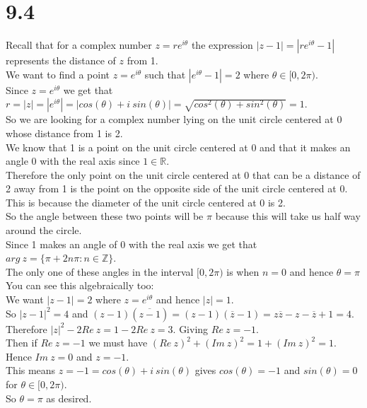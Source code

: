 \documentclass{article}
\begin{document}
\newpage
\section*{9.4}
\begin{center}
    \doublespacing
    Recall that for a complex number $z = r e^{i\theta}$ the expression $|z - 1| = |r e^{i\theta} - 1|$ represents the distance of $z$ from 1.
    \\We want to find a point $z = e^{i\theta}$ such that $|e^{i\theta} - 1| = 2$ where $\theta\in [0, 2\pi)$.
    \\Since $z = e^{i\theta}$ we get that $r = |z| = |e^{i\theta}| = |cos(\theta) + i\:sin(\theta)| =\sqrt{cos^2 (\theta) + sin^2 (\theta)} = 1$.
    \\So we are looking for a complex number lying on the unit circle centered at 0 whose distance from 1 is 2.
    \\We know that 1 is a point on the unit circle centered at 0 and that it makes an angle 0 with the real axis since $1\in\mathbb{R}$.
    \\Therefore the only point on the unit circle centered at 0 that can be a distance of 2 away from 1 is the point on the opposite side of the unit circle centered at 0. This is because the diameter of the unit circle centered at 0 is 2.
    \break
    \\So the angle between these two points will be $\pi$ because this will take us half way around the circle.
    \\Since 1 makes an angle of 0 with the real axis we get that $arg\:z =\{\pi + 2n\pi: n\in\mathbb{Z}\}$.
    \\The only one of these angles in the interval $[0, 2\pi)$ is when $n = 0$ and hence $\theta =\pi$ \qedsymbol
    \break
    \\You can see this algebraically too:
    \\We want $|z - 1| = 2$ where $z = e^{i\theta}$ and hence $|z| = 1$.
    \\So $|z - 1|^2 = 4$ and $(z-1)(\overline{z-1}) = (z-1)(\overline{z} - 1) = z\overline{z} - z -\overline{z} + 1 = 4$.
    \\Therefore $|z|^2 - 2 Re\:z = 1 - 2 Re\:z = 3$. Giving $Re\:z = -1$.
    \\Then if $Re\:z = -1$ we must have $(Re\:z)^2 + (Im\:z)^2 = 1 + (Im\:z)^2 = 1$. Hence $Im\:z = 0$ and $z = -1$.
    \\This means $z = -1 = cos(\theta) + i\:sin(\theta)$ gives $cos(\theta) = -1$ and $sin(\theta) = 0$ for $\theta\in [0, 2\pi)$.
    \\So $\theta =\pi$ as desired.
\end{center}
\end{document}
